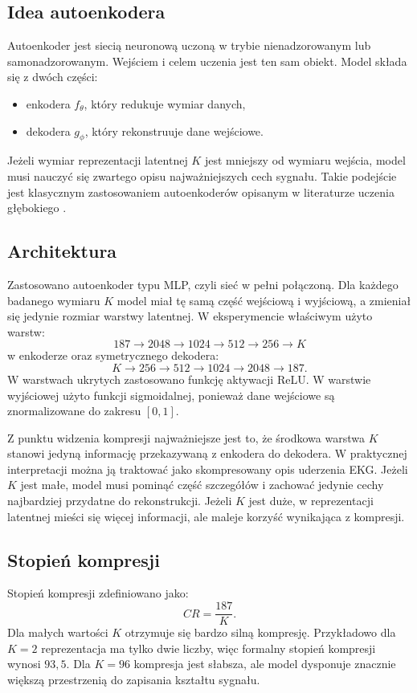 \documentclass[12pt,a4paper]{article}
\begin{document}
\subsection{Idea autoenkodera}
Autoenkoder jest siecią neuronową uczoną w trybie nienadzorowanym lub samonadzorowanym. Wejściem i celem uczenia jest ten sam obiekt. Model składa się z dwóch części:
\begin{itemize}
    \item enkodera $f_\theta$, który redukuje wymiar danych,
    \item dekodera $g_\phi$, który rekonstruuje dane wejściowe.
\end{itemize}
Jeżeli wymiar reprezentacji latentnej $K$ jest mniejszy od wymiaru wejścia, model musi nauczyć się zwartego opisu najważniejszych cech sygnału. Takie podejście jest klasycznym zastosowaniem autoenkoderów opisanym w literaturze uczenia głębokiego \cite{goodfellow2016}.

\subsection{Architektura}
Zastosowano autoenkoder typu MLP, czyli sieć w pełni połączoną. Dla każdego badanego wymiaru $K$ model miał tę samą część wejściową i wyjściową, a zmieniał się jedynie rozmiar warstwy latentnej. W eksperymencie właściwym użyto warstw:
\[
187 \rightarrow 2048 \rightarrow 1024 \rightarrow 512 \rightarrow 256 \rightarrow K
\]
w enkoderze oraz symetrycznego dekodera:
\[
K \rightarrow 256 \rightarrow 512 \rightarrow 1024 \rightarrow 2048 \rightarrow 187.
\]
W warstwach ukrytych zastosowano funkcję aktywacji ReLU. W warstwie wyjściowej użyto funkcji sigmoidalnej, ponieważ dane wejściowe są znormalizowane do zakresu $[0,1]$.

Z punktu widzenia kompresji najważniejsze jest to, że środkowa warstwa $K$ stanowi jedyną informację przekazywaną z enkodera do dekodera. W praktycznej interpretacji można ją traktować jako skompresowany opis uderzenia EKG. Jeżeli $K$ jest małe, model musi pominąć część szczegółów i zachować jedynie cechy najbardziej przydatne do rekonstrukcji. Jeżeli $K$ jest duże, w reprezentacji latentnej mieści się więcej informacji, ale maleje korzyść wynikająca z kompresji.

\subsection{Stopień kompresji}
Stopień kompresji zdefiniowano jako:
\[
    CR = \frac{187}{K}.
\]
Dla małych wartości $K$ otrzymuje się bardzo silną kompresję. Przykładowo dla $K=2$ reprezentacja ma tylko dwie liczby, więc formalny stopień kompresji wynosi $93{,}5$. Dla $K=96$ kompresja jest słabsza, ale model dysponuje znacznie większą przestrzenią do zapisania kształtu sygnału.
\end{document}

